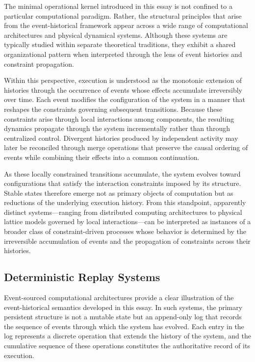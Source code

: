 \documentclass[12pt]{article}
\begin{document}
The minimal operational kernel introduced in this essay
is not confined to a particular computational paradigm.
Rather, the structural principles that arise from the
event-historical framework appear across a wide range of
computational architectures and physical dynamical systems.
Although these systems are typically studied within
separate theoretical traditions, they exhibit a shared
organizational pattern when interpreted through the lens
of event histories and constraint propagation.

Within this perspective, execution is understood as the
monotonic extension of histories through the occurrence
of events whose effects accumulate irreversibly over time.
Each event modifies the configuration of the system in a
manner that reshapes the constraints governing subsequent
transitions. Because these constraints arise through
local interactions among components, the resulting
dynamics propagate through the system incrementally
rather than through centralized control. Divergent
histories produced by independent activity may later be
reconciled through merge operations that preserve the
causal ordering of events while combining their effects
into a common continuation.

As these locally constrained transitions accumulate,
the system evolves toward configurations that satisfy
the interaction constraints imposed by its structure.
Stable states therefore emerge not as primary objects
of computation but as reductions of the underlying
execution history. From this standpoint, apparently
distinct systems—ranging from distributed computing
architectures to physical lattice models governed by
local interactions—can be interpreted as instances of
a broader class of constraint-driven processes whose
behavior is determined by the irreversible accumulation
of events and the propagation of constraints across
their histories.

\subsection{Deterministic Replay Systems}

Event-sourced computational architectures provide a clear
illustration of the event-historical semantics developed
in this essay. In such systems, the primary persistent
structure is not a mutable state but an append-only log
that records the sequence of events through which the
system has evolved. Each entry in the log represents a
discrete operation that extends the history of the system,
and the cumulative sequence of these operations constitutes
the authoritative record of its execution.
\end{document}
